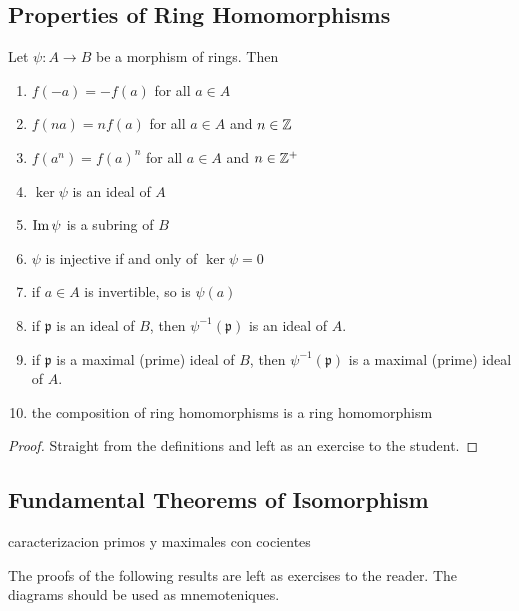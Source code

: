 \documentclass[11pt,a4paper]{article}
\begin{document}
\subsection{Properties of Ring Homomorphisms}

\begin{prop}
Let \(\psi\colon A\to B\) be a morphism of rings.
Then
\begin{enumerate}[label=(\roman*)]
\item \( f(-a) = -f(a) \) for all \(a\in A\)
\item \( f(na) = nf(a) \)  for all \(a\in A\) and \(n\in \mathbb{Z}\)
\item \( f(a^n) = f(a)^n \)  for all \(a\in A\) and \(n\in \mathbb{Z}^+\)

\item \(\ker \psi \) is an ideal of \(A\)
\item \(\operatorname{Im} \psi\) is a subring of \(B\)
\item \(\psi\) is injective if and only of \(\ker \psi = 0\)
\item if \(a\in A\) is invertible, so is \(\psi(a)\)
\item if \(\mathfrak{p}\) is an ideal of \(B\), then \(\psi^{-1}(\mathfrak{p})\) is an ideal of \(A\).
\item if \(\mathfrak{p}\) is a maximal (prime) ideal of \(B\), then \(\psi^{-1}(\mathfrak{p})\) is a maximal (prime) ideal of \(A\).
\item the composition of ring homomorphisms is a ring homomorphism
\end{enumerate}
\end{prop}

\begin{proof}
    Straight from the definitions and left as an exercise to the student.
\end{proof}

\pagebreak
\subsection{Fundamental Theorems of Isomorphism}

caracterizacion primos y maximales con cocientes

The proofs of the following results  are left as exercises to the reader.
The diagrams should be used as mnemoteniques.
\end{document}
